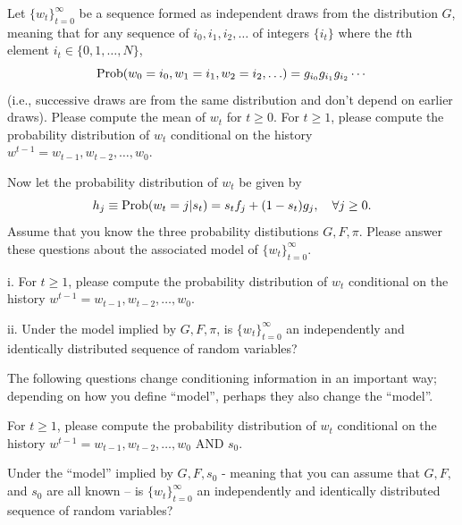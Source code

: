 \medskip
{}  Let  $\{w_t\}_{t=0}^\infty$ be a sequence formed as independent draws from the distribution $G$, meaning that
for any sequence of $i_0, i_1, i_2, \ldots $ of integers $\{i_t\}$ where the $t$th element $i_t  \in \{0, 1, \ldots, N\}$,
 $${\rm Prob}(w_0 = i_0, w_1 = i_1, w_2 = i_2, \ldots)  = g_{i_0} g_{i_1} g_{i_2}  \cdots $$
(i.e., successive draws are from the same distribution and don't depend on earlier draws). Please compute the mean of $w_t$ for $t \geq 0$.
For $t \geq 1$,
please compute the probability distribution of  $w_t$ conditional on the history $w^{t-1} = w_{t-1}, w_{t-2}, \ldots, w_0$.

\medskip
{} Now let  the probability distribution of $w_t$  be given by
$$ h_j \equiv {\rm Prob}(w_t = j | s_t)  = s_t f_j + (1-s_t) g_j ,  \quad \forall j \geq 0. $$
Assume that you know the three probability distibutions $G, F, \pi$.
Please answer these questions about the associated   model of  $\{w_t\}_{t=0}^\infty$.


\smallskip
\item{i.}  For $t \geq 1$,
please compute the probability distribution of  $w_t$ conditional on the history $w^{t-1} = w_{t-1}, w_{t-2}, \ldots, w_0$.


\item{ii.} Under the model implied by $G, F, \pi$, is $\{w_t\}_{t=0}^\infty$ an independently and identically distributed sequence of random variables?




\noindent The following questions change conditioning information in an important way; depending on how you define ``model'', perhaps they also change the ``model''.


\medskip
{} For $t \geq 1$,
please compute the probability distribution of  $w_t$ conditional on  the history $w^{t-1} = w_{t-1}, w_{t-2}, \ldots, w_0$ AND $s_0$.

\medskip
{} Under the ``model'' implied by $G, F, s_0$  - meaning that you can assume that $G, F,$ and $s_0$ are all known --  is $\{w_t\}_{t=0}^\infty$ an independently and identically distributed sequence of random variables?






 




\bye



